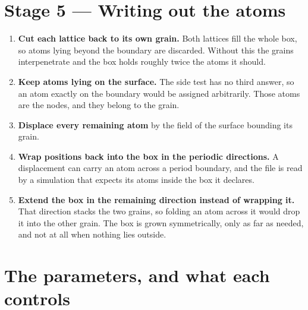 \documentclass[11pt]{article}
\begin{document}
\section*{Stage 5 --- Writing out the atoms}

\begin{enumerate}
  \item \textbf{Cut each lattice back to its own grain.} Both lattices fill the
        whole box, so atoms lying beyond the boundary are discarded. Without
        this the grains interpenetrate and the box holds roughly twice the atoms
        it should.
  \item \textbf{Keep atoms lying on the surface.} The side test has no third
        answer, so an atom exactly on the boundary would be assigned
        arbitrarily. Those atoms are the nodes, and they belong to the grain.
  \item \textbf{Displace every remaining atom} by the field of the surface
        bounding its grain.
  \item \textbf{Wrap positions back into the box in the periodic directions.} A
        displacement can carry an atom across a period boundary, and the file is
        read by a simulation that expects its atoms inside the box it declares.
  \item \textbf{Extend the box in the remaining direction instead of wrapping
        it.} That direction stacks the two grains, so folding an atom across it
        would drop it into the other grain. The box is grown symmetrically,
        only as far as needed, and not at all when nothing lies outside.
\end{enumerate}

\section*{The parameters, and what each controls}
\end{document}
